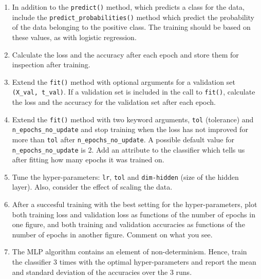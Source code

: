 \documentclass[a4paper,landscape]{article}
\begin{document}
\begin{enumerate}
\def\labelenumi{\alph{enumi})}
\item
  In addition to the \texttt{predict()} method, which predicts a class
  for the data, include the \texttt{predict\_probabilities()} method
  which predict the probability of the data belonging to the positive
  class. The training should be based on these values, as with logistic
  regression.
\item
  Calculate the loss and the accuracy after each epoch and store them
  for inspection after training.
\item
  Extend the \texttt{fit()} method with optional arguments for a
  validation set \texttt{(X\_val,\ t\_val)}. If a validation set is
  included in the call to \texttt{fit()}, calculate the loss and the
  accuracy for the validation set after each epoch.
\item
  Extend the \texttt{fit()} method with two keyword arguments,
  \texttt{tol} (tolerance) and \texttt{n\_epochs\_no\_update} and stop
  training when the loss has not improved for more than \texttt{tol}
  after \texttt{n\_epochs\_no\_update}. A possible default value for
  \texttt{n\_epochs\_no\_update} is 2. Add an attribute to the
  classifier which tells us after fitting how many epochs it was trained
  on.
\item
  Tune the hyper-parameters: \texttt{lr}, \texttt{tol} and
  \texttt{dim-hidden} (size of the hidden layer). Also, consider the
  effect of scaling the data.
\item
  After a succesful training with the best setting for the
  hyper-parameters, plot both training loss and validation loss as
  functions of the number of epochs in one figure, and both training and
  validation accuracies as functions of the number of epochs in another
  figure. Comment on what you see.
\item
  The MLP algorithm contains an element of non-determinism. Hence, train
  the classifier 3 times with the optimal hyper-parameters and report
  the mean and standard deviation of the accuracies over the 3 runs.
\end{enumerate}
\end{document}
